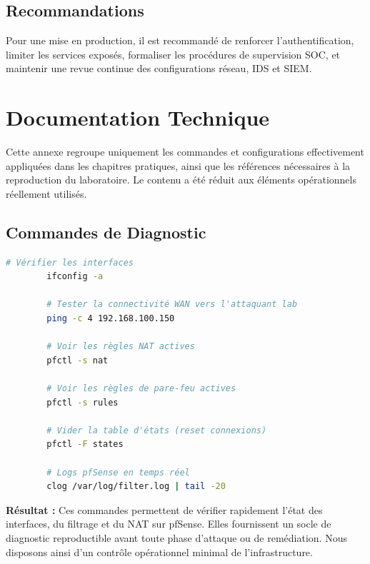 \documentclass[12pt,a4paper,openany]{report}
\begin{document}
	\section{Recommandations}
	Pour une mise en production, il est recommandé de renforcer l'authentification, limiter les services exposés, formaliser les procédures de supervision SOC, et maintenir une revue continue des configurations réseau, IDS et SIEM.
	
	
	\appendix
	\chapter{Documentation Technique}
	\label{app:doc-technique}
	
	\begin{tcolorbox}[colback=primary!5!white, colframe=primary, title=\textbf{Annexe A — Documentation Technique Consolidée}]
		Cette annexe regroupe uniquement les commandes et configurations effectivement appliquées dans les chapitres pratiques, ainsi que les références nécessaires à la reproduction du laboratoire. Le contenu a été réduit aux éléments opérationnels réellement utilisés.
	\end{tcolorbox}
	
	\section{Commandes de Diagnostic}
	\label{sec:app-commandes}
	
	\begin{lstlisting}[language=bash, caption={Commandes de diagnostic pfSense (shell)}]
		# Vérifier les interfaces
		ifconfig -a
		
		# Tester la connectivité WAN vers l'attaquant lab
		ping -c 4 192.168.100.150
		
		# Voir les règles NAT actives
		pfctl -s nat
		
		# Voir les règles de pare-feu actives
		pfctl -s rules
		
		# Vider la table d'états (reset connexions)
		pfctl -F states
		
		# Logs pfSense en temps réel
		clog /var/log/filter.log | tail -20
	\end{lstlisting}
	\textbf{Résultat :} Ces commandes permettent de vérifier rapidement l’état des interfaces, du filtrage et du NAT sur pfSense. Elles fournissent un socle de diagnostic reproductible avant toute phase d’attaque ou de remédiation. Nous disposons ainsi d’un contrôle opérationnel minimal de l’infrastructure.
	
\end{document}
